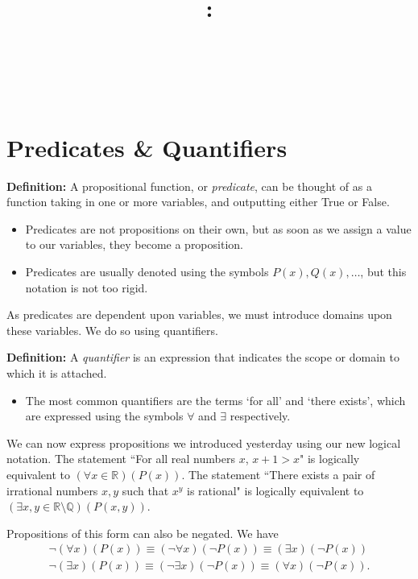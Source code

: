 \documentclass{article}
\title{
    \vspace{2in}
    \textbf{\lectClass:\\ \lectTitle}\\
    \vspace{0.1in}\large{\textit{\lectClassInstructor\ \lectSection}}
    \vspace{3in}
    \author{\textbf{\lectAuthorName}}
    \date{}
}
\begin{document}
\maketitle
\pagebreak

\section*{Predicates \& Quantifiers}
    \textbf{Definition:} A propositional function, or \textit{predicate}, can be thought of as a function taking in one or more variables, and outputting either True or False.
    \begin{itemize}
        \item Predicates are not propositions on their own, but as soon as we assign a value to our variables, they become a proposition.
        \item Predicates are usually denoted using the symbols $P(x), Q(x), \dots$, but this notation is not too rigid.
    \end{itemize}
    
    As predicates are dependent upon variables, we must introduce domains upon these variables. We do so using quantifiers.
    
    \vspace{1.5mm}
    \textbf{Definition: }A \textit{quantifier} is an expression that indicates the scope or domain to which it is attached.
        \begin{itemize}
            \item The most common quantifiers are the terms `for all' and `there exists', which are expressed using the symbols $\forall$ and $\exists$ respectively.
        \end{itemize}
    
    We can now express propositions we introduced yesterday using our new logical notation. The statement ``For all real numbers $x$, $x + 1 > x$" is logically equivalent to $(\forall x \in \mathbb{R})(P(x))$. The statement ``There exists a pair of irrational numbers $x, y$ such that $x^{y}$ is rational" is logically equivalent to $(\exists x, y \in \mathbb{R} \setminus \mathbb{Q})(P(x, y))$.
    
    \vspace{1.5mm}
    Propositions of this form can also be negated. We have 
    \begin{align*}
        \neg(\forall x)(P(x)) \equiv (\neg\forall x)(\neg P(x)) \equiv (\exists x)(\neg P(x)) \\
        \neg(\exists x)(P(x)) \equiv (\neg\exists x)(\neg P(x)) \equiv (\forall x)(\neg P(x)).
    \end{align*}
\end{document}
